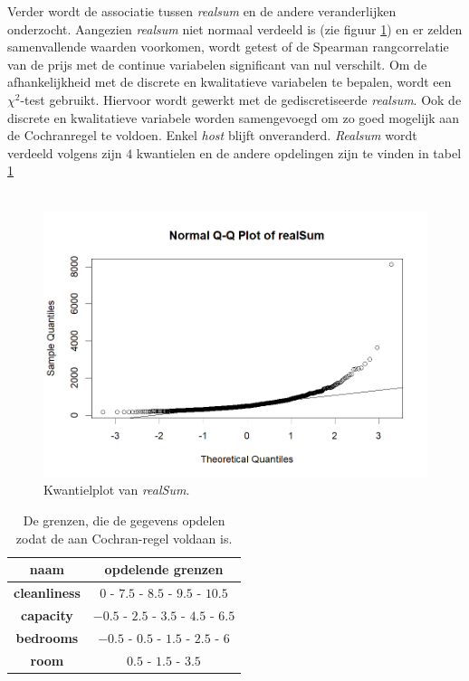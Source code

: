 \documentclass[a4paper]{kulakarticle}
\begin{document}
	Verder wordt de associatie tussen \textit{realsum} en de andere veranderlijken onderzocht. Aangezien \textit{realsum} niet normaal verdeeld is (zie figuur \ref{fig:qqplotvrealsum}) en er zelden samenvallende waarden voorkomen, wordt getest of de Spearman rangcorrelatie van de prijs met de continue variabelen significant van nul verschilt. Om de afhankelijkheid met de discrete en kwalitatieve variabelen te bepalen, wordt een $\chi ^2$-test gebruikt. Hiervoor wordt gewerkt met de gediscretiseerde \textit{realsum}. Ook de discrete en kwalitatieve variabele worden samengevoegd om zo goed mogelijk aan de Cochranregel te voldoen. Enkel \textit{host} blijft onveranderd. \textit{Realsum} wordt verdeeld volgens zijn $4$ kwantielen en de andere opdelingen zijn te vinden in tabel \ref{grenzen}\\\\
	
	
\begin{figure}
	\centering
	\includegraphics[width=0.7\linewidth]{Figuren/qqplotvrealSum}
	\caption{Kwantielplot van \textit{realSum}.}
	\label{fig:qqplotvrealsum}
\end{figure}
	
	\begin{table}[h]
		\centering
			\begin{tabular}{c|c}
			\centering
			naam& opdelende grenzen\\
			\hline
			\textbf{cleanliness} & $ 0 $ - $ 7.5 $ - $ 8.5$ - $ 9.5 $ - $ 10.5$ \\
			\textbf{capacity}& $-0.5$ - $2.5$ - $3.5$ - $4.5$ - $6.5$\\
			\textbf{bedrooms}& $-0.5$ - $0.5$ - $1.5$ - $2.5$ - $6$\\
			\textbf{room} & $0.5$ - $1.5$ - $3.5$\\
			\end{tabular}
			\caption{De grenzen, die de gegevens opdelen zodat de aan Cochran-regel voldaan is.}
			\label{grenzen}
	\end{table}
\end{document}

